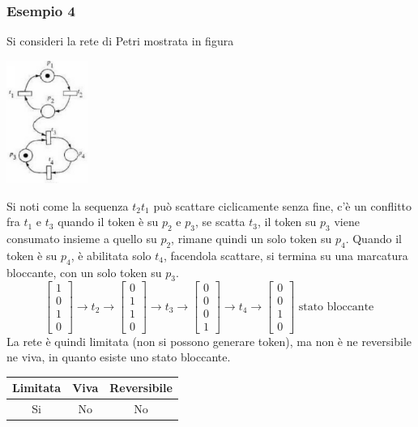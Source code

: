 \documentclass[10pt, letterpaper]{report}
\begin{document}
\subsubsection{Esempio 4}
Si consideri la rete di Petri mostrata in figura  
\begin{center}
    \includegraphics[width=0.2\textwidth]{images/PetriEs4.png}
\end{center}
Si noti come la sequenza $t_2t_1$ può scattare ciclicamente senza fine, c'è un conflitto fra $t_1$ e $t_3$ quando il token è su $p_2$ e $p_3$, se scatta $t_3$, il token su $p_3$ viene consumato insieme a quello su $p_2$, rimane quindi un solo token su $p_4$.\acc 
Quando il token è su $p_4$, è abilitata solo $t_4$, facendola scattare, si termina su una marcatura bloccante, con un solo token su $p_3$.
$$\begin{bmatrix}
    1\\ 0 \\ 1 \\ 0 
\end{bmatrix}\rightarrow t_2 \rightarrow 
\begin{bmatrix}
    0\\ 1 \\ 1 \\ 0 
\end{bmatrix}\rightarrow t_3 \rightarrow 
\begin{bmatrix}
    0\\ 0 \\ 0 \\ 1 
\end{bmatrix}\rightarrow t_4 \rightarrow \begin{bmatrix}
    0\\ 0 \\ 1 \\ 0 
\end{bmatrix} \text{ stato bloccante }$$
La rete è quindi limitata (non si possono generare token), ma non è ne reversibile ne viva, in quanto esiste uno stato bloccante.
\begin{center}
    \begin{tabular}{|c|c|c|}
        \hline
        \rowcolor[HTML]{EFEFEF} 
        Limitata & Viva & Reversibile \\ \hline
        Si       & No   & No          \\ \hline
        \end{tabular}
\end{center}
\end{document}

